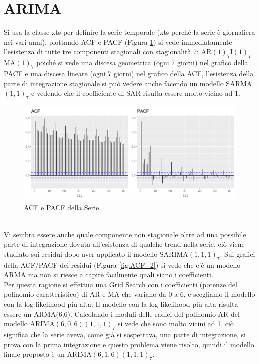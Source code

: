 \documentclass[12pt, onecolumn]{article}
\begin{document}
\section*{ARIMA}
Si usa la classe xts per definire la serie temporale (xts perché la serie è giornaliera nei vari anni), plottando ACF e PACF (Figura \ref{fig:ACF_1}) si vede immediatamente l'esistenza di tutte tre componenti stagionali con stagionalità 7: AR$(1)_7$I$(1)_7$MA$(1)_7$ poiché si vede una discesa geometrica (ogni 7 giorni) nel grafico della PACF e una discesa lineare (ogni 7 giorni) nel grafico della ACF, l'esistenza della parte di integrazione stagionale si può vedere anche facendo un modello SARMA$(1,1)_7$ e vedendo che il coefficiente di SAR risulta essere molto vicino ad 1. 
\begin{figure}[!h]
  \centering
  \includegraphics[width=\linewidth,height=5cm]{imgs/ACF_1.png}
  \caption{ACF e PACF della Serie.}
  \label{fig:ACF_1}
\end{figure}\\
Vi sembra essere anche quale componente non stagionale oltre ad una possibile parte di integrazione dovuta all'esistenza di qualche trend nella serie, ciò viene studiato sui residui dopo aver applicato il modello SARIMA$(1,1,1)_7$.
Sui grafici della ACF/PACF dei residui (Figura \ref{fig:ACF_2}) si vede che c'è un modello ARMA ma non si riesce a capire facilmente quali siano i coefficienti.\\
Per questa ragione si effettua una Grid Search con i coefficienti (potenze del polinomio caratteristico) di AR e MA che variano da 0 a 6, e scegliamo il modello con la log-likelihood più alta: Il modello con la log-likelihood più alta risulta essere un ARMA(6,6). Calcolando i moduli delle radici del polinomio AR del modello ARIMA$(6,0,6)(1,1,1)_7$ si vede che sono molto vicini ad 1, ciò significa che la serie aveva, come già si sospettava,  una parte di integrazione, si prova con la prima integrazione e questo problema viene risolto, quindi il modello finale proposto è un ARIMA$(6,1,6)(1,1,1)_7$.\\
\end{document}
